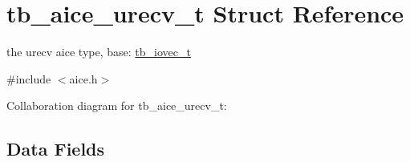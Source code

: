 \hypertarget{structtb__aice__urecv__t}{\section{tb\-\_\-aice\-\_\-urecv\-\_\-t Struct Reference}
\label{structtb__aice__urecv__t}
}


the urecv aice type, base\-: \hyperlink{structtb__iovec__t}{tb\-\_\-iovec\-\_\-t}  




{\ttfamily \#include $<$aice.\-h$>$}



Collaboration diagram for tb\-\_\-aice\-\_\-urecv\-\_\-t\-:
\subsection*{Data Fields}
